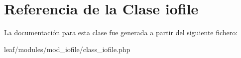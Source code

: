 \hypertarget{classiofile}{\section{Referencia de la Clase iofile}
\label{classiofile}
}


La documentación para esta clase fue generada a partir del siguiente fichero\-:\begin{DoxyCompactItemize}
\item 
leaf/modules/mod\-\_\-iofile/class\-\_\-iofile.\-php\end{DoxyCompactItemize}
